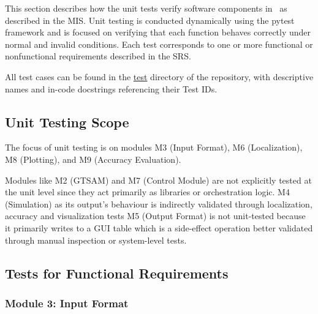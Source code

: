 \documentclass[12pt, titlepage]{article}
\begin{document}
This section describes how the unit tests verify software components in \progname~as described in the MIS. Unit testing is conducted dynamically using the pytest framework and is focused on verifying that each function behaves correctly under normal and invalid conditions. Each test corresponds to one or more functional or nonfunctional requirements described in the SRS.

All test cases can be found in the \href{https://github.com/AliyahJimoh/2D-Localizer/tree/main/test}{test} directory of the repository, with descriptive names and in-code docstrings referencing their Test IDs.

\subsection{Unit Testing Scope}


The focus of unit testing is on modules M3 (Input Format), M6 (Localization), M8 (Plotting), and M9 (Accuracy Evaluation).

Modules like M2 (GTSAM) and M7 (Control Module) are not explicitly tested at the unit level since they act primarily as libraries or orchestration logic. M4 (Simulation) as its output's behaviour is indirectly validated through localization, accuracy and visualization tests M5 (Output Format) is not unit-tested because it primarily writes to a GUI table which is a side-effect operation better validated through manual inspection or system-level tests.

\subsection{Tests for Functional Requirements}


\subsubsection{Module 3: Input Format}
\end{document}
